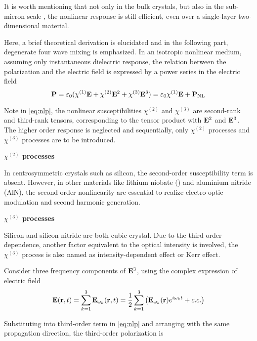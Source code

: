 It is worth mentioning that not only in the bulk crystals, but also in the sub-micron scale \cite{Leuthold2010}, the nonlinear response is still efficient, even over a single-layer two-dimensional material.

Here, a brief theoretical derivation is elucidated and in the following part, degenerate four wave mixing is emphasized. In an isotropic nonlinear medium, assuming only instantaneous dielectric response, the relation between the polarization and the electric field is expressed by a power series in the electric field
\begin{equation}\label{eq:nlp}
    \vb{P} = \varepsilon_0 \large (\chi^{(1)}\vb{E} + \chi^{(2)}\vb{E}^2 + \chi^{(3)}\vb{E}^3)
    = \varepsilon_0 \chi^{(1)}\vb{E} + \vb{P}_\mathrm{NL}
\end{equation}

Note in \autoref{eq:nlp}, the nonlinear susceptibilities $\chi^{(2)}$ and $\chi^{(3)}$ are second-rank and third-rank tensors, corresponding to the tensor product with $\vb{E}^2$ and $\vb{E}^3$. The higher order response is neglected and sequentially, only $\chi^{(2)}$ processes and $\chi^{(3)}$ processes are to be introduced.

\bigskip
\noindent\textbf{$\chi^{(2)}$ processes} 

In centrosymmetric crystals such as silicon, the second-order susceptibility term is absent. However, in other materials like lithium niobate () and aluminium nitride (AlN), the second-order nonlinearity are essential to realize electro-optic modulation and second harmonic generation.

\bigskip
\noindent\textbf{$\chi^{(3)}$ processes} 

Silicon and silicon nitride are both cubic crystal. Due to the third-order dependence, another factor equivalent to the optical intensity is involved, the $\chi^{(3)}$ process is also named as intensity-dependent effect or Kerr effect.

Consider three frequency components of $\vb{E}^3$, using the complex expression of electric field
\begin{equation}
    \vb{E}(\vb{r}, t) = \sum_{k=1}^3 \vb{E}_{\omega_k}(\vb{r}, t) =  \frac{1}{2} \sum_{k=1}^3 \qty ( \vb{E}_{\omega_k}(\vb{r})e^{i\omega_k t} + c.c.)
\end{equation}
\begin{figure}
    
    \label{fig:energy-level}
\end{figure}
Substituting into third-order term in \autoref{eq:nlp} and arranging with the same propagation direction, the third-order polarization is 

